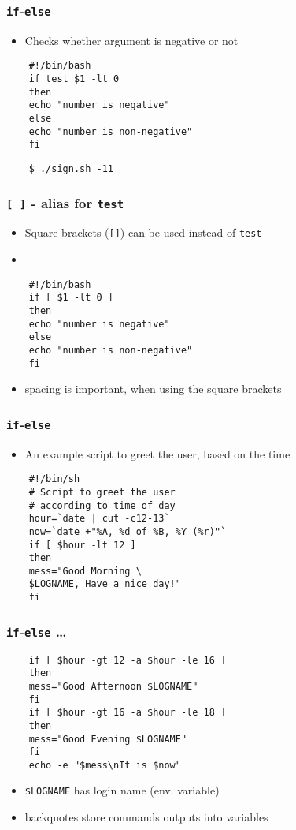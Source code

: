 \documentclass[12pt,compress]{beamer}
\newcounter{time}
\begin{document}
\begin{frame}[fragile]
  \frametitle{\texttt{if}-\texttt{else}}
  \begin{itemize}
  \item Checks whether argument is negative or not
  \end{itemize}
  \begin{lstlisting}
    #!/bin/bash
    if test $1 -lt 0
    then
    echo "number is negative"
    else
    echo "number is non-negative"
    fi
  \end{lstlisting} %
  \begin{lstlisting}
    $ ./sign.sh -11
  \end{lstlisting} %
\end{frame}

\begin{frame}[fragile]
  \frametitle{\texttt{[ ]} - alias for \texttt{test}}
  \begin{itemize}
  \item Square brackets (\texttt{[]}) can be used instead of
    \texttt{test}
  \item 
  \end{itemize}
  \begin{lstlisting}
    #!/bin/bash
    if [ $1 -lt 0 ]
    then
    echo "number is negative"
    else
    echo "number is non-negative"
    fi
  \end{lstlisting} %
  \begin{itemize}
  \item \alert{spacing is important, when using the square brackets}
  \end{itemize}
\end{frame}

\begin{frame}[fragile]
  \frametitle{\texttt{if}-\texttt{else}}
  \begin{itemize}
  \item An example script to greet the user, based on the time
  \end{itemize}
  \begin{lstlisting}
    #!/bin/sh
    # Script to greet the user 
    # according to time of day
    hour=`date | cut -c12-13`
    now=`date +"%A, %d of %B, %Y (%r)"`
    if [ $hour -lt 12 ]
    then
    mess="Good Morning \
    $LOGNAME, Have a nice day!"
    fi
  \end{lstlisting} %
\end{frame}

\begin{frame}[fragile]
  \frametitle{\texttt{if}-\texttt{else} \ldots}
  \begin{lstlisting}
    if [ $hour -gt 12 -a $hour -le 16 ]
    then
    mess="Good Afternoon $LOGNAME"
    fi
    if [ $hour -gt 16 -a $hour -le 18 ]
    then
    mess="Good Evening $LOGNAME"
    fi
    echo -e "$mess\nIt is $now"
  \end{lstlisting} %
  \begin{itemize}
  \item \texttt{\$LOGNAME} has login name (env. variable) 
  \item backquotes store commands outputs into variables
  \end{itemize}
\end{frame}
\end{document}
